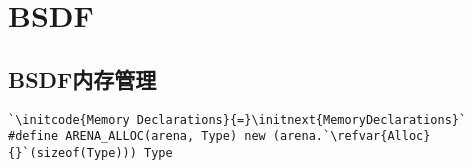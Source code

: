 \section{BSDF}\label{sec:BSDF}

\subsection{BSDF内存管理}\label{sub:BSDF内存管理}
\begin{lstlisting}
`\initcode{Memory Declarations}{=}\initnext{MemoryDeclarations}`
#define ARENA_ALLOC(arena, Type) new (arena.`\refvar{Alloc}{}`(sizeof(Type))) Type
\end{lstlisting}